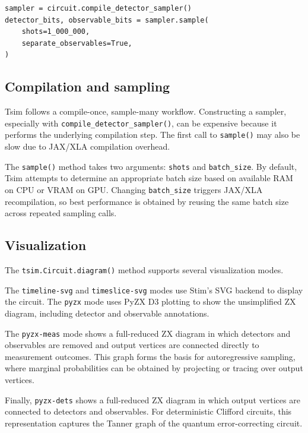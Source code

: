 \documentclass[
  a4paper,
  onecolumn,
  11pt,
  allowtoday
]{quantumarticle}
\begin{document}
\begin{lstlisting}[caption={Sampling detector and observable outcomes separately.}]
sampler = circuit.compile_detector_sampler()
detector_bits, observable_bits = sampler.sample(
    shots=1_000_000,
    separate_observables=True,
)
\end{lstlisting}

\subsection{Compilation and sampling}

Tsim follows a compile-once, sample-many workflow. Constructing a sampler, especially with \texttt{compile\_detector\_sampler()}, can be expensive because it performs the underlying compilation step. The first call to \texttt{sample()} may also be slow due to JAX/XLA compilation overhead.

The \texttt{sample()} method takes two arguments: \texttt{shots} and \texttt{batch\_size}. By default, Tsim attempts to determine an appropriate batch size based on available RAM on CPU or VRAM on GPU. Changing \texttt{batch\_size} triggers JAX/XLA recompilation, so best performance is obtained by reusing the same batch size across repeated sampling calls.

\subsection{Visualization}

The \texttt{tsim.Circuit.diagram()} method supports several visualization modes.

The \texttt{timeline-svg} and \texttt{timeslice-svg} modes use Stim's SVG backend to display the circuit. The \texttt{pyzx} mode uses PyZX D3 plotting to show the unsimplified ZX diagram, including detector and observable annotations.

The \texttt{pyzx-meas} mode shows a full-reduced ZX diagram in which detectors and observables are removed and output vertices are connected directly to measurement outcomes. This graph forms the basis for autoregressive sampling, where marginal probabilities can be obtained by projecting or tracing over output vertices.

Finally, \texttt{pyzx-dets} shows a full-reduced ZX diagram in which output vertices are connected to detectors and observables. For deterministic Clifford circuits, this representation captures the Tanner graph of the quantum error-correcting circuit.
\end{document}
